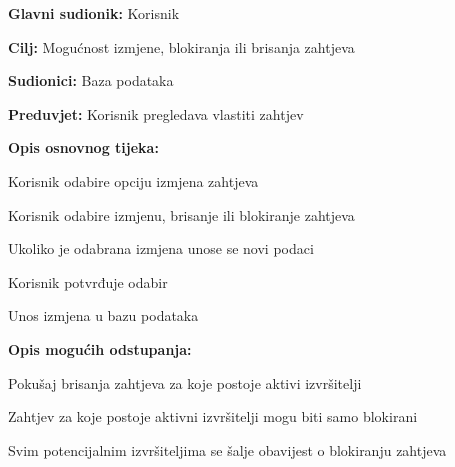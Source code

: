 					\noindent {}
					\begin{packed_item}
						
						\item \textbf{Glavni sudionik: }Korisnik
						\item  \textbf{Cilj:} Mogućnost izmjene, blokiranja ili brisanja zahtjeva
						\item  \textbf{Sudionici:} Baza podataka
						\item  \textbf{Preduvjet:} Korisnik pregledava vlastiti zahtjev
						\item  \textbf{Opis osnovnog tijeka:}
						
						\item[] \begin{packed_enum}
							
							\item Korisnik odabire opciju izmjena zahtjeva
							\item Korisnik odabire izmjenu, brisanje ili blokiranje zahtjeva
							\item Ukoliko je odabrana izmjena unose se novi podaci
							\item Korisnik potvrđuje odabir
							\item Unos izmjena u bazu podataka
							
						\end{packed_enum}
					
						\item  \textbf{Opis mogućih odstupanja:}
						
						\item[] \begin{packed_item}
							
							\item[2.a] Pokušaj brisanja zahtjeva za koje postoje aktivi izvršitelji
							\item[] \begin{packed_enum}
								
								\item Zahtjev za koje postoje aktivni izvršitelji mogu biti samo blokirani
								\item Svim potencijalnim izvršiteljima se šalje obavijest o blokiranju zahtjeva
								
							\end{packed_enum}				
						\end{packed_item}
						
					\end{packed_item}
				
